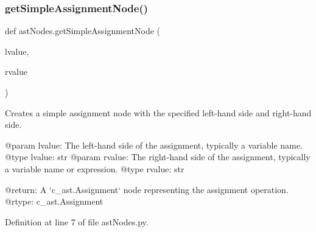 \subsubsection{\texorpdfstring{get\+Simple\+Assignment\+Node()}{getSimpleAssignmentNode()}}
{\footnotesize\ttfamily def ast\+Nodes.\+get\+Simple\+Assignment\+Node (\begin{DoxyParamCaption}\item[{}]{lvalue,  }\item[{}]{rvalue }\end{DoxyParamCaption})}

\begin{DoxyVerb}Creates a simple assignment node with the specified left-hand side and right-hand side.

@param lvalue: The left-hand side of the assignment, typically a variable name.
@type lvalue: str
@param rvalue: The right-hand side of the assignment, typically a variable name or expression.
@type rvalue: str

@return: A `c_ast.Assignment` node representing the assignment operation.
@rtype: c_ast.Assignment
\end{DoxyVerb}
 

Definition at line 7 of file ast\+Nodes.\+py.



